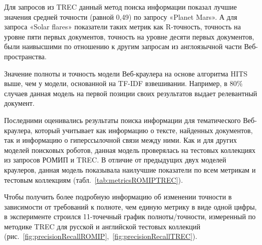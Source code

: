 Для запросов из TREC данный метод поиска информации показал лучшие значения средней точности (равной 0,49) по запросу «Planet Mars». А для запроса «Solar flares» показатели таких метрик как R-точность, точность на уровне пяти первых документов, точность на уровне десяти первых документов, были наивысшими по отношению к другим запросам из англоязычной части Веб-пространства.

Значение полноты и точность модели Веб-краулера на основе алгоритма HITS выше, чем у модели, основанной на TF-IDF взвешивании. Например, в 80\% случаев данная модель на первой позиции своих результатов выдает релевантный документ.

Последними оценивались результаты поиска информации для тематического Веб-краулера, который учитывает как информацию о тексте, найденных документов, так и информацию о гиперссылочной связи между ними. Как и для других моделей поисковых роботов, данная модель проверялась на тестовых коллекциях из запросов РОМИП и TREC. В отличие от предыдущих двух моделей краулеров, данная модель показывала наилучшие показатели по всем метрикам и тестовым коллекциям (табл.~\cref{tab:metricsROMIPTREC}).

Чтобы получить более подробную информацию об изменении точности в зависимости от требований к полноте, чем единую метрику в виде одной цифры, в эксперименте строился 11-точечный график полноты/точности, измеренный по методике TREC для русской и английской тестовых коллекций (рис.~\cref{fig:precisionRecallROMIP},~\cref{fig:precisionRecallTREC}).

\begin{figure}[ht]
    \caption[Этот текст попадает в названия рисунков в списке рисунков]{}\label{fig:precisionRecallROMIPTREC}
\end{figure}

